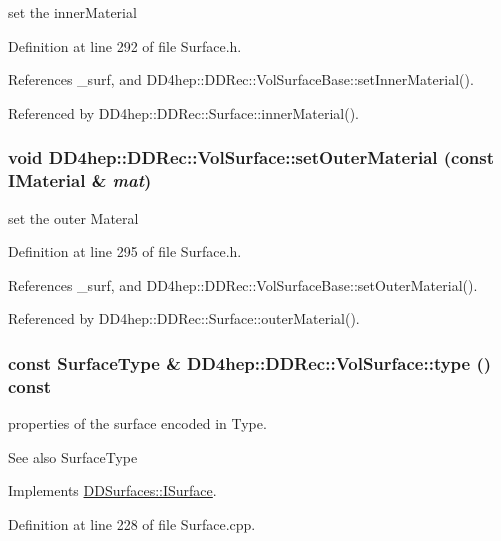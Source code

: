 set the innerMaterial 

Definition at line 292 of file Surface.h.

References \_\-surf, and DD4hep::DDRec::VolSurfaceBase::setInnerMaterial().

Referenced by DD4hep::DDRec::Surface::innerMaterial().\hypertarget{class_d_d4hep_1_1_d_d_rec_1_1_vol_surface_af6a4ee6256e72d0b10e7ebfb54fc28da}{
\subsubsection[{setOuterMaterial}]{\setlength{\rightskip}{0pt plus 5cm}void DD4hep::DDRec::VolSurface::setOuterMaterial (const {\bf IMaterial} \& {\em mat})}}
\label{class_d_d4hep_1_1_d_d_rec_1_1_vol_surface_af6a4ee6256e72d0b10e7ebfb54fc28da}


set the outer Materal 

Definition at line 295 of file Surface.h.

References \_\-surf, and DD4hep::DDRec::VolSurfaceBase::setOuterMaterial().

Referenced by DD4hep::DDRec::Surface::outerMaterial().\hypertarget{class_d_d4hep_1_1_d_d_rec_1_1_vol_surface_a3911ecafb91850168cadebc3ab2d5092}{
\subsubsection[{type}]{\setlength{\rightskip}{0pt plus 5cm}const {\bf SurfaceType} \& DD4hep::DDRec::VolSurface::type () const}}
\label{class_d_d4hep_1_1_d_d_rec_1_1_vol_surface_a3911ecafb91850168cadebc3ab2d5092}
properties of the surface encoded in Type. \begin{DoxySeeAlso}{See also}
SurfaceType 
\end{DoxySeeAlso}


Implements \hyperlink{class_d_d_surfaces_1_1_i_surface_aab772d11a61d7ae966d535be0da2a626}{DDSurfaces::ISurface}.

Definition at line 228 of file Surface.cpp.

